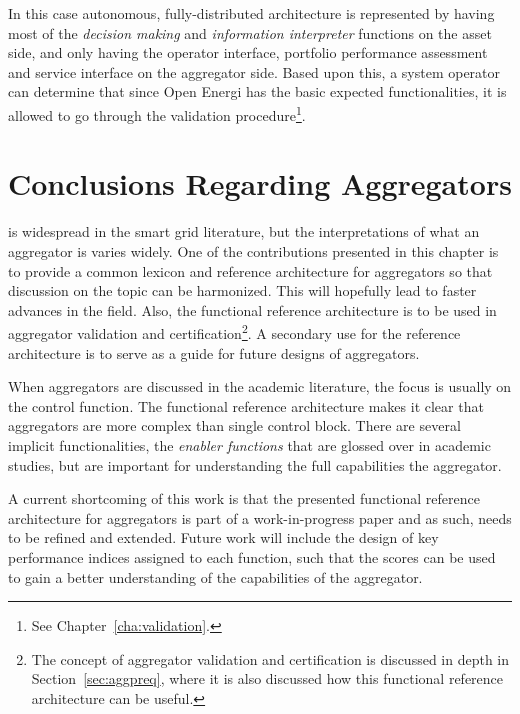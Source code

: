In this case autonomous, fully-distributed architecture is represented by having  most of the \emph{decision making} and \emph{information interpreter} functions on the asset side, and only having the operator interface, portfolio performance assessment and service interface on the aggregator side. Based upon this, a system operator can determine that since Open Energi has the basic expected functionalities, it is allowed to go through the validation procedure\footnote{See Chapter~\ref{cha:validation}.}. 

\section{Conclusions Regarding Aggregators}
 is widespread in the smart grid literature, but the interpretations of what an aggregator is varies widely. One of the contributions presented in this chapter is to provide a common lexicon and reference architecture for aggregators so that discussion on the topic can be harmonized. This will hopefully lead to faster advances in the field. Also, the functional reference architecture is to be used in aggregator validation and certification\footnote{The concept of aggregator validation and certification is discussed in depth in Section~\ref{sec:aggpreq}, where it is also discussed how this functional reference architecture can be useful.}. A secondary use for the reference architecture is to serve as a guide for future designs of aggregators.

When aggregators are discussed in the academic literature, the focus is usually on the control function. The functional reference architecture makes it clear that aggregators are more complex than single control block. There are several implicit functionalities, \eg the \emph{enabler functions} that are glossed over in academic studies, but are important for understanding the full capabilities the aggregator.

A current shortcoming of this work is that the presented functional reference architecture for aggregators is part of a work-in-progress paper and as such, needs to be refined and extended. Future work will include the design of key performance indices assigned to each function, such that the scores can be used to gain a better understanding of the capabilities of the aggregator. 

